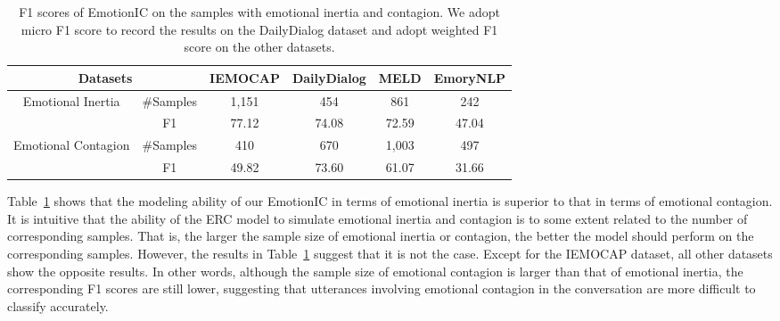 \documentclass{SCIS2019}
\begin{document}
\begin{table}[htbp]
\caption{F1 scores of EmotionIC on the samples with emotional inertia and contagion. We adopt micro F1 score to record the results on the DailyDialog dataset and adopt weighted F1 score on the other datasets.}
\label{tab:InerandCont}	
\begin{center}
\renewcommand{\arraystretch}{1.0}
\setlength{\tabcolsep}{10pt}
\begin{tabular}{c|c|cccc}
\toprule
\multicolumn{2}{c|}{Datasets} &  IEMOCAP & DailyDialog & MELD & EmoryNLP\\ 
\cline{2-5}
\hline
\multirow{2}{*}{Emotional Inertia} &\#Samples &1,151 & 454 & 861 &242\\
							& F1&77.12 &74.08 &72.59 &47.04\\
\hline
\multirow{2}{*}{Emotional Contagion} &\#Samples &410 &670 &1,003 &497\\
							& F1&49.82 &73.60 &61.07 &31.66\\
\bottomrule
\end{tabular}
\end{center}
\end{table}
Table~\ref{tab:InerandCont} shows that the modeling ability of our EmotionIC in terms of emotional inertia is superior to that in terms of emotional contagion. It is intuitive that the ability of the ERC model to simulate emotional inertia and contagion is to some extent related to the number of corresponding samples. That is, the larger the sample size of emotional inertia or contagion, the better the model should perform on the corresponding samples. However, the results in Table~\ref{tab:InerandCont} suggest that it is not the case. Except for the IEMOCAP dataset, all other datasets show the opposite results. In other words, although the sample size of emotional contagion is larger than that of emotional inertia, the corresponding F1 scores are still lower, suggesting that utterances involving emotional contagion in the conversation are more difficult to classify accurately.
\end{document}
